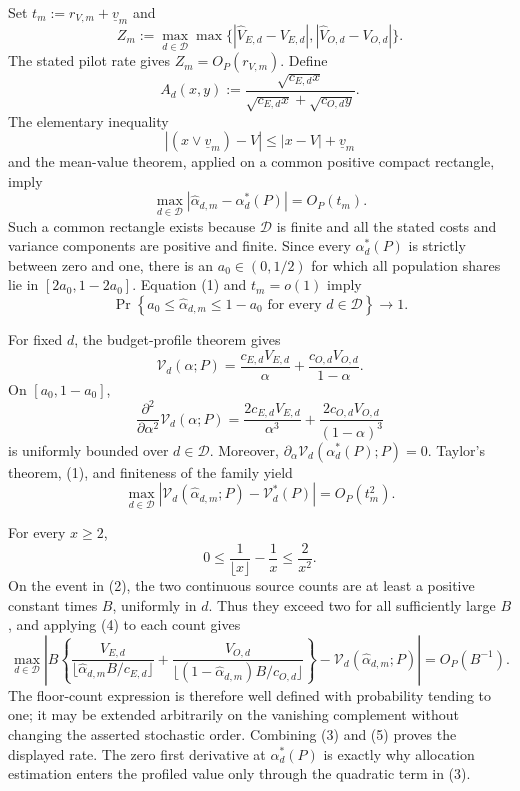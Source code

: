 Set \(t_m:=r_{V,m}+\underline v_m\) and
\[
 Z_m:=\max_{d\in\mathcal D}\max\bigl\{
 |\widehat V_{E,d}-V_{E,d}|,
 |\widehat V_{O,d}-V_{O,d}|\bigr\}.
\]
The stated pilot rate gives \(Z_m=O_P(r_{V,m})\).  Define
\[
 A_d(x,y):=
 \frac{\sqrt{c_{E,d}x}}
 {\sqrt{c_{E,d}x}+\sqrt{c_{O,d}y}}.
\]
The elementary inequality
\[
 |(x\vee\underline v_m)-V|
 \le |x-V|+\underline v_m
\]
and the mean-value theorem, applied on a common positive compact rectangle, imply
\[
 \max_{d\in\mathcal D}
 |\widehat\alpha_{d,m}-\alpha_d^*(P)|=O_P(t_m).                            \tag{1}
\]
Such a common rectangle exists because \(\mathcal D\) is finite and all the stated costs and variance components are positive and finite.  Since every \(\alpha_d^*(P)\) is strictly between zero and one, there is an \(a_0\in(0,1/2)\) for which all population shares lie in \([2a_0,1-2a_0]\).  Equation (1) and \(t_m=o(1)\) imply
\[
 \Pr\!\left\{a_0\le\widehat\alpha_{d,m}\le1-a_0
       \text{ for every }d\in\mathcal D\right\}\longrightarrow1.       \tag{2}
\]

For fixed \(d\), the budget-profile theorem gives
\[
 \mathcal V_d(\alpha;P)
 =\frac{c_{E,d}V_{E,d}}{\alpha}
  +\frac{c_{O,d}V_{O,d}}{1-\alpha}.
\]
On \([a_0,1-a_0]\),
\[
 \frac{\partial^2}{\partial\alpha^2}\mathcal V_d(\alpha;P)
 =\frac{2c_{E,d}V_{E,d}}{\alpha^3}
  +\frac{2c_{O,d}V_{O,d}}{(1-\alpha)^3}
\]
is uniformly bounded over \(d\in\mathcal D\).  Moreover,
\(\partial_\alpha\mathcal V_d(\alpha_d^*(P);P)=0\).  Taylor's theorem, (1), and finiteness of the family yield
\[
 \max_{d\in\mathcal D}
 \left|\mathcal V_d(\widehat\alpha_{d,m};P)-\mathcal V_d^*(P)\right|
 =O_P(t_m^2).                                                               \tag{3}
\]

For every \(x\ge2\),
\[
 0\le \frac1{\lfloor x\rfloor}-\frac1x
 \le\frac2{x^2}.                                                          \tag{4}
\]
On the event in (2), the two continuous source counts are at least a positive constant times \(B\), uniformly in \(d\).  Thus they exceed two for all sufficiently large \(B\), and applying (4) to each count gives
\[
 \max_{d\in\mathcal D}\left|
 B\left\{
 \frac{V_{E,d}}{\lfloor\widehat\alpha_{d,m}B/c_{E,d}\rfloor}
 +\frac{V_{O,d}}{\lfloor(1-\widehat\alpha_{d,m})B/c_{O,d}\rfloor}
 \right\}
 -\mathcal V_d(\widehat\alpha_{d,m};P)
 \right|=O_P(B^{-1}).                                                       \tag{5}
\]
The floor-count expression is therefore well defined with probability tending to one; it may be extended arbitrarily on the vanishing complement without changing the asserted stochastic order.  Combining (3) and (5) proves the displayed rate.  The zero first derivative at \(\alpha_d^*(P)\) is exactly why allocation estimation enters the profiled value only through the quadratic term in (3).